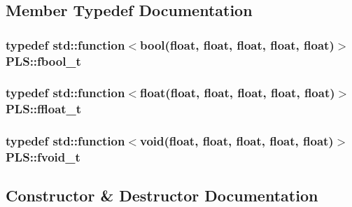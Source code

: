 \subsection{Member Typedef Documentation}
\subsubsection[{\texorpdfstring{fbool\+\_\+t}{fbool_t}}]{\setlength{\rightskip}{0pt plus 5cm}typedef std\+::function$<$bool(float, float, float, float, float)$>$ {\bf P\+L\+S\+::fbool\+\_\+t}\hspace{0.3cm}{\ttfamily [protected]}}\hypertarget{class_p_l_s_ae518559a64636a22c6e5f5eaa82cc420}{}\label{class_p_l_s_ae518559a64636a22c6e5f5eaa82cc420}
\subsubsection[{\texorpdfstring{ffloat\+\_\+t}{ffloat_t}}]{\setlength{\rightskip}{0pt plus 5cm}typedef std\+::function$<$float(float, float, float, float, float)$>$ {\bf P\+L\+S\+::ffloat\+\_\+t}\hspace{0.3cm}{\ttfamily [protected]}}\hypertarget{class_p_l_s_a001f46380d29f9a3703cc78ee928b244}{}\label{class_p_l_s_a001f46380d29f9a3703cc78ee928b244}
\subsubsection[{\texorpdfstring{fvoid\+\_\+t}{fvoid_t}}]{\setlength{\rightskip}{0pt plus 5cm}typedef std\+::function$<$void(float, float, float, float, float)$>$ {\bf P\+L\+S\+::fvoid\+\_\+t}\hspace{0.3cm}{\ttfamily [protected]}}\hypertarget{class_p_l_s_a2c9371dd235f3c41295d15c92ac9f33b}{}\label{class_p_l_s_a2c9371dd235f3c41295d15c92ac9f33b}


\subsection{Constructor \& Destructor Documentation}
